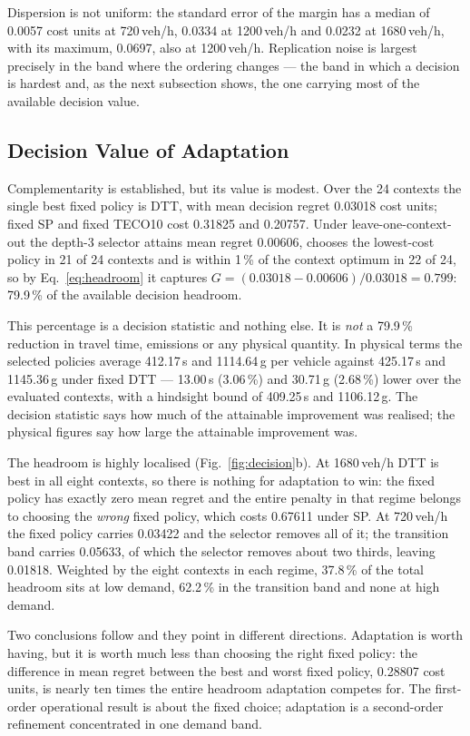 Dispersion is not uniform: the standard error of the margin has a median of 0.0057 cost
units at 720\,veh/h, 0.0334 at 1200\,veh/h and 0.0232 at 1680\,veh/h, with its maximum,
0.0697, also at 1200\,veh/h. Replication noise is largest precisely in the band where the
ordering changes --- the band in which a decision is hardest and, as the next subsection
shows, the one carrying most of the available decision value.

\subsection{Decision Value of Adaptation}
\label{sec:value}

Complementarity is established, but its value is modest. Over the 24 contexts the single
best fixed policy is DTT, with mean decision regret 0.03018 cost units; fixed SP and
fixed TECO10 cost 0.31825 and 0.20757. Under leave-one-context-out the depth-3 selector
attains mean regret 0.00606, chooses the lowest-cost policy in 21 of 24 contexts and is
within 1\,\% of the context optimum in 22 of 24, so by Eq.~\eqref{eq:headroom} it captures
$G=(0.03018-0.00606)/0.03018=0.799$: 79.9\,\% of the available decision headroom.

This percentage is a decision statistic and nothing else. It is \emph{not} a 79.9\,\%
reduction in travel time, emissions or any physical quantity. In physical terms the
selected policies average 412.17\,s and 1114.64\,g per vehicle against 425.17\,s and
1145.36\,g under fixed DTT --- 13.00\,s (3.06\,\%) and 30.71\,g (2.68\,\%) lower over the
evaluated contexts, with a hindsight bound of 409.25\,s and 1106.12\,g. The decision
statistic says how much of the attainable improvement was realised; the physical figures
say how large the attainable improvement was.

The headroom is highly localised (Fig.~\ref{fig:decision}b). At 1680\,veh/h DTT is best
in all eight contexts, so there is nothing for adaptation to win: the fixed policy has
exactly zero mean regret and the entire penalty in that regime belongs to choosing the
\emph{wrong} fixed policy, which costs 0.67611 under SP. At 720\,veh/h the fixed policy
carries 0.03422 and the selector removes all of it; the transition band carries 0.05633,
of which the selector removes about two thirds, leaving 0.01818. Weighted by the eight
contexts in each regime, 37.8\,\% of the total headroom sits at low demand, 62.2\,\% in
the transition band and none at high demand.

Two conclusions follow and they point in different directions. Adaptation is worth having,
but it is worth much less than choosing the right fixed policy: the difference in mean
regret between the best and worst fixed policy, 0.28807 cost units, is nearly ten times
the entire headroom adaptation competes for. The first-order operational result is about
the fixed choice; adaptation is a second-order refinement concentrated in one demand
band.

